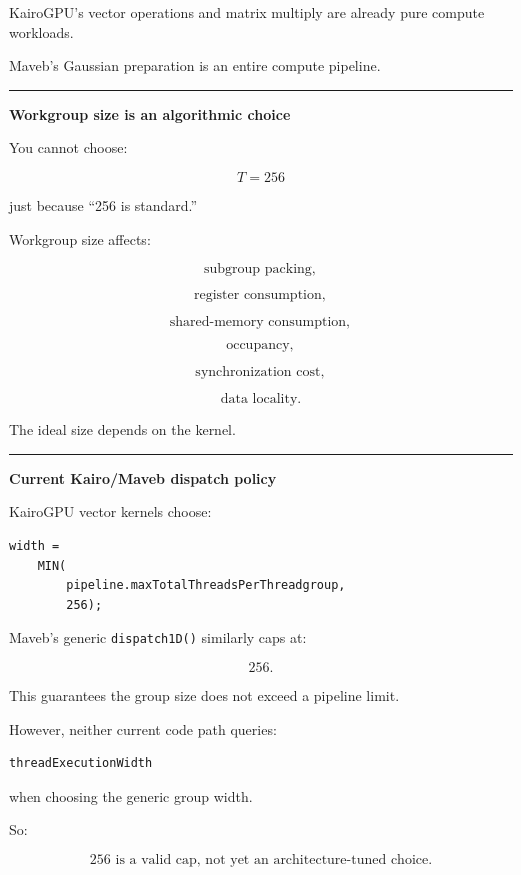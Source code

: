 KairoGPU's vector operations and matrix multiply are already pure compute workloads.

Maveb's Gaussian preparation is an entire compute pipeline.

\begin{center}\rule{0.5\linewidth}{0.5pt}\end{center}

\textbf{Workgroup size is an algorithmic choice}

You cannot choose:

\[
T=256
\]

just because ``256 is standard.''

Workgroup size affects:

\[
\text{subgroup packing},
\]

\[
\text{register consumption},
\]

\[
\text{shared-memory consumption},
\]

\[
\text{occupancy},
\]

\[
\text{synchronization cost},
\]

\[
\text{data locality}.
\]

The ideal size depends on the kernel.

\begin{center}\rule{0.5\linewidth}{0.5pt}\end{center}

\textbf{Current Kairo/Maveb dispatch policy}

KairoGPU vector kernels choose:

\protect{}\label{ozt45h}%
\begin{verbatim}
width =
    MIN(
        pipeline.maxTotalThreadsPerThreadgroup,
        256);
\end{verbatim}

Maveb's generic \texttt{dispatch1D()} similarly caps at:

\[
256.
\]

This guarantees the group size does not exceed a pipeline limit.

However, neither current code path queries:

\protect{}\label{p4wrmn}%
\begin{verbatim}
threadExecutionWidth
\end{verbatim}

when choosing the generic group width.

So:

\[
\boxed{
256\text{ is a valid cap, not yet an architecture-tuned choice}.
}
\]

